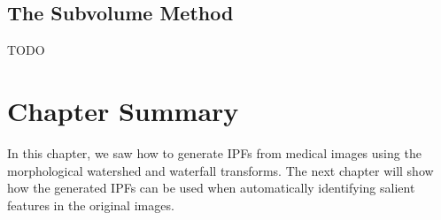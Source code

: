 \subsection{The Subvolume Method}
\label{subsec:segmentation-ipfconstruction-subvolume}

TODO

\section{Chapter Summary}

In this chapter, we saw how to generate IPFs from medical images using the morphological watershed and waterfall transforms. The next chapter will show how the generated IPFs can be used when automatically identifying salient features in the original images.
